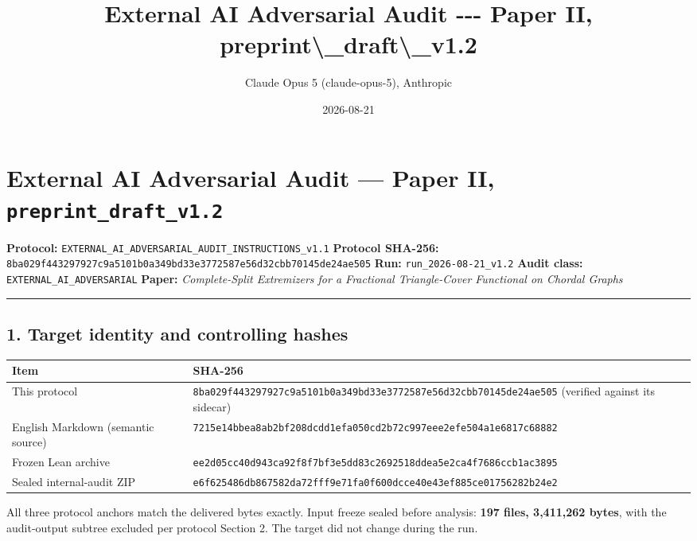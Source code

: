 \documentclass[
  9pt,
  a4paper,
]{article}
\title{External AI Adversarial Audit -\/-\/- Paper II,
preprint\textbackslash\_draft\textbackslash\_v1.2}
\author{Claude Opus 5 (claude-opus-5), Anthropic}
\date{2026-08-21}
\newcounter{none} %
\begin{document}
\maketitle

\section{\texorpdfstring{External AI Adversarial Audit --- Paper II,
\texttt{preprint\_draft\_v1.2}}{External AI Adversarial Audit --- Paper II, preprint\_draft\_v1.2}}\label{external-ai-adversarial-audit--paper-ii-preprint_draft_v12}

\textbf{Protocol:}
\texttt{EXTERNAL\_AI\_ADVERSARIAL\_AUDIT\_INSTRUCTIONS\_v1.1}
\textbf{Protocol SHA-256:}
\texttt{8ba029f443297927c9a5101b0a349bd33e3772587e56d32cbb70145de24ae505}
\textbf{Run:} \texttt{run\_2026-08-21\_v1.2} \textbf{Audit class:}
\texttt{EXTERNAL\_AI\_ADVERSARIAL} \textbf{Paper:} \emph{Complete-Split
Extremizers for a Fractional Triangle-Cover Functional on Chordal
Graphs}

\begin{center}\rule{0.5\linewidth}{0.5pt}\end{center}

\subsection{1. Target identity and controlling
hashes}\label{1-target-identity-and-controlling-hashes}

{\def\LTcaptype{none} %
\begin{longtable}[]{@{}ll@{}}
\toprule\noalign{}
Item & SHA-256 \\
\midrule\noalign{}
\endhead
\bottomrule\noalign{}
\endlastfoot
This protocol &
\texttt{8ba029f443297927c9a5101b0a349bd33e3772587e56d32cbb70145de24ae505}
(verified against its sidecar) \\
English Markdown (semantic source) &
\texttt{7215e14bbea8ab2bf208dcdd1efa050cd2b72c997eee2efe504a1e6817c68882} \\
Frozen Lean archive &
\texttt{ee2d05cc40d943ca92f8f7bf3e5dd83c2692518ddea5e2ca4f7686ccb1ac3895} \\
Sealed internal-audit ZIP &
\texttt{e6f625486db867582da72fff9e71fa0f600dcce40e43ef885ce01756282b24e2} \\
\end{longtable}
}

All three protocol anchors match the delivered bytes exactly. Input
freeze sealed before analysis: \textbf{197 files, 3,411,262 bytes}, with
the audit-output subtree excluded per protocol Section 2. The target did
not change during the run.
\end{document}
